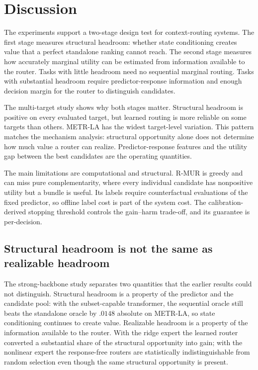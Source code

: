 \section{Discussion}

The experiments support a two-stage design test for context-routing systems.
The first stage measures structural headroom: whether state conditioning
creates value that a perfect standalone ranking cannot reach. The second stage
measures how accurately marginal utility can be estimated from information
available to the router. Tasks with little headroom need no sequential
marginal routing. Tasks with substantial headroom require predictor-response
information and enough decision margin for the router to distinguish
candidates.

The multi-target study shows why both stages matter. Structural headroom is
positive on every evaluated target, but learned routing is more reliable on
some targets than others. METR-LA has the widest target-level variation. This
pattern matches the mechanism analysis: structural opportunity alone does not
determine how much value a router can realize. Predictor-response features and
the utility gap between the best candidates are the operating quantities.

The main limitations are computational and structural. R-MUR is greedy and can
miss pure complementarity, where every individual candidate has nonpositive
utility but a bundle is useful. Its labels require counterfactual evaluations
of the fixed predictor, so offline label cost is part of the system cost. The
calibration-derived stopping threshold controls the gain--harm trade-off, and
its guarantee is per-decision.

\subsection{Structural headroom is not the same as realizable headroom}

The strong-backbone study separates two quantities that the earlier results
could not distinguish. Structural headroom is a property of the predictor and
the candidate pool: with the subset-capable transformer, the sequential oracle
still beats the standalone oracle by $.0148$ absolute on METR-LA, so state
conditioning continues to create value. Realizable headroom is a property of
the information available to the router. With the ridge expert the learned
router converted a substantial share of the structural opportunity into gain;
with the nonlinear expert the response-free routers are statistically
indistinguishable from random selection even though the same structural
opportunity is present.

